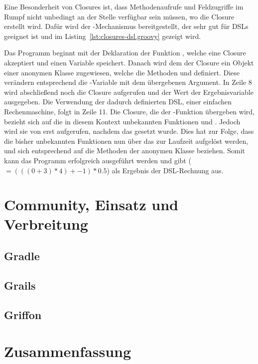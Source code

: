 Eine Besonderheit von Closures ist, dass Methodenaufrufe und Feldzugriffe im Rumpf nicht unbedingt an der Stelle verfügbar sein müssen, wo die Closure erstellt wird.
Dafür wird der -Mechanismus bereitgestellt, der sehr gut für DSLs geeignet ist und im Listing~\ref{lst:closures-dsl.groovy} gezeigt wird.


Das Programm beginnt mit der Deklaration der Funktion , welche eine Closure akzeptiert und einen Variable  speichert.
Danach wird dem  der Closure ein Objekt einer anonymen Klasse zugewiesen, welche die Methoden  und  definiert.
Diese verändern entsprechend die -Variable mit dem übergebenen Argument.
In Zeile 8 wird abschließend noch die Closure aufgerufen und der Wert der Ergebnisvariable ausgegeben.
Die Verwendung der dadurch definierten DSL, einer einfachen Rechenmaschine, folgt in Zeile 11.
Die Closure, die der -Funktion übergeben wird, bezieht sich auf die in diesem Kontext unbekannten Funktionen  und .
Jedoch wird sie von  erst aufgerufen, nachdem das  gesetzt wurde.
Dies hat zur Folge, dass die bisher unbekannten Funktionen nun über das  zur Laufzeit aufgelöst werden, und sich entsprechend auf die Methoden der anonymen Klasse beziehen.
Somit kann das Programm erfolgreich ausgeführt werden und gibt  ($=(((0+3)*4)+-1)*0.5$) als Ergebnis der DSL-Rechnung aus.


\section{Community, Einsatz und Verbreitung}\label{sec:community}


\subsection{Gradle}\label{subsec:gradle}


\subsection{Grails}\label{subsec:grails}


\subsection{Griffon}\label{subsec:griffon}



\section{Zusammenfassung}\label{sec:zusammenfassung}







